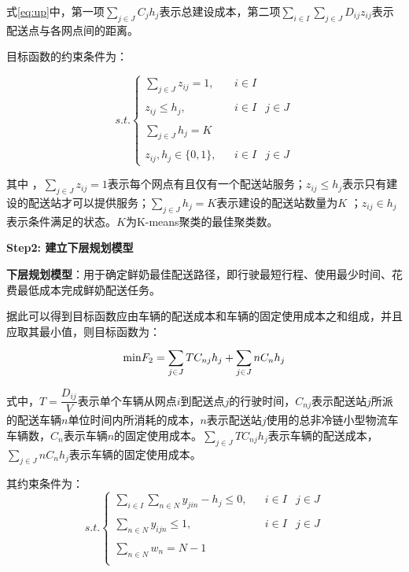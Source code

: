 \documentclass[withoutpreface,bwprint]{cumcmthesis} %
\begin{document}
式\eqref{eq:up}中，第一项$\sum\limits_{j\in J}^{}{{{C}_{j}}}{{h}_{j}}$表示总建设成本，第二项$\sum\limits_{i\in I}^{}{\sum\limits_{j\in J}^{}{{{D}_{ij}}}}{{z}_{ij}}$表示配送点与各网点间的距离。

目标函数的约束条件为：

\begin{equation}
	s.t.\left\{ {\begin{array}{*{20}{c}}
			{\sum\limits_{j \in J}^{} {{z_{ij}}}  = 1,}&{}&{i \in I}&{}\\
			{}&{}&{}&{}\\
			{{z_{ij}} \le {h_j},}&{}&{i \in I}&{j \in J}\\
			{}&{}&{}&{}\\
			{\sum\limits_{j \in J}^{} {{h_j} = K} }&{}&{}&{}\\
			{}&{}&{}&{}\\
			{{z_{ij}},{h_j} \in \{ 0,1\} ,}&{}&{i \in I}&{j \in J}
	\end{array}} \right.
\end{equation}

其中 ，$\sum\limits_{j \in J}^{} {{z_{ij}}}=1$表示每个网点有且仅有一个配送站服务；${z_{ij}} \le {h_j}$表示只有建设的配送站才可以提供服务；$\sum\limits_{j \in J}^{} {{h_j} = K} $表示建设的配送站数量为$K$ ；${{z}_{ij}}\in {{h}_{j}}$ 表示条件满足的状态。$K$为K-means聚类的最佳聚类数。

\textbf{Step2: 建立下层规划模型}

\textbf{下层规划模型}：用于确定鲜奶最佳配送路径，即行驶最短行程、使用最少时间、花费最低成本完成鲜奶配送任务。

据此可以得到目标函数应由车辆的配送成本和车辆的固定使用成本之和组成，并且应取其最小值，则目标函数为：
	\begin{equation}
		{\rm{min }}{F_2} = \sum\limits_{j \in J}^{} {T{C_{nj}}} {h_j} + \sum\limits_{j \in J}^{} {n{C_n}} {h_j}
	\end{equation}
	

式中，$T=\dfrac{{{D}_{ij}}}{V}$表示单个车辆从网点$i$到配送点$j$的行驶时间，${{C}_{nj}}$表示配送站$j$所派的配送车辆$n$单位时间内所消耗的成本，$n$表示配送站$j$使用的总非冷链小型物流车车辆数，$C_n$表示车辆$n$的固定使用成本。$\sum\limits_{j \in J}^{} {T{C_{nj}}} {h_j}$表示车辆的配送成本，$\sum\limits_{j \in J}^{} {n{C_n}} {h_j}$表示车辆的固定使用成本。


其约束条件为：
	\begin{equation}
s.t.\left \{{\begin{matrix}\sum_{i\in I}^{}{\sum_{n\in N}^{}{{{y}_{jin}}}}-{{h}_{j}}\le 0,&&i\in I&j\in J\\&&&\\\sum_{n\in N}^{}{{{y}_{ijn}}}\le 1,&&i\in I&j\in J\\&&&\\\sum_{n\in N}^{}{{{w}_{n}}}=N-1&&&\\&&&\end{matrix}}\right .
	\end{equation}
\end{document}
